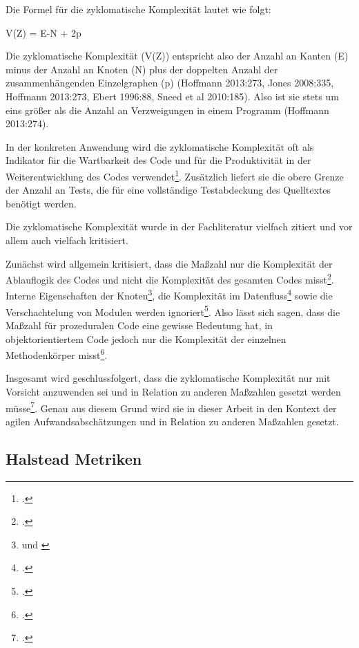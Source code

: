 Die Formel für die zyklomatische Komplexität lautet wie folgt:

V(Z) = \textbar E\textbar-\textbar N\textbar{} + 2p

Die zyklomatische Komplexität (V(Z)) entspricht also der Anzahl an
Kanten (E) minus der Anzahl an Knoten (N) plus der doppelten Anzahl der
zusammenhängenden Einzelgraphen (p) (Hoffmann 2013:273, Jones 2008:335,
Hoffmann 2013:273, Ebert 1996:88, Sneed et al 2010:185). Also ist sie
stets um eins grö\ss er als die Anzahl an Verzweigungen in einem Programm
(Hoffmann 2013:274).

In der konkreten Anwendung wird die zyklomatische Komplexität oft als
Indikator für die Wartbarkeit des Code und für die Produktivität in der
Weiterentwicklung des Codes verwendet\footcite[Vgl. ][S. 336]{jonesAppliedSoftwareMeasurement2008}.
Zusätzlich liefert sie die obere Grenze der Anzahl an Tests, die für
eine vollständige Testabdeckung des Quelltextes benötigt werden.

Die zyklomatische Komplexität wurde in der Fachliteratur vielfach
zitiert und vor allem auch vielfach kritisiert.

Zunächst wird allgemein kritisiert, dass die Ma\ss zahl nur die Komplexität
der Ablauflogik des Codes und nicht die Komplexität des gesamten Codes
misst\footcite[Vgl. ][S. 186]{sneedSoftwareZahlenVermessung2010}. Interne Eigenschaften der Knoten\footnote{\cite[Vgl. ][S. 73]{hoffmannSoftwareQualitat2013} und \cite[S. 2]{rumreichExaminingSoftwareDesign2019}}, die Komplexität im Datenfluss\footcite[Vgl. ][S. 2]{rumreichExaminingSoftwareDesign2019} sowie die Verschachtelung von Modulen werden
ignoriert\footcite[Vgl. ][S. 89ff]{zuseSoftwareComplexityMeasures1991}. Also lässt sich sagen, dass die
Ma\ss zahl für prozeduralen Code eine gewisse Bedeutung hat, in
objektorientiertem Code jedoch nur die Komplexität der einzelnen
Methodenkörper misst\footcite[Vgl. ][S. 186]{sneedSoftwareZahlenVermessung2010}.

Insgesamt wird geschlussfolgert, dass die zyklomatische Komplexität nur
mit Vorsicht anzuwenden sei und in Relation zu anderen Ma\ss zahlen gesetzt
werden müsse\footcite[Vgl. ][S. 52]{fentonSoftwareMetricsRigorous2003}. Genau
aus diesem Grund wird sie in dieser Arbeit in den Kontext der agilen
Aufwandsabschätzungen und in Relation zu anderen Ma\ss zahlen gesetzt.

\subsection{Halstead Metriken}\label{Halstead-Metriken}

